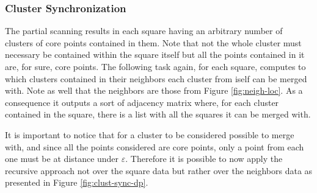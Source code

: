 \documentclass[10pt,journal,compsoc]{IEEEtran}
\begin{document}
\subsubsection{Cluster Synchronization} \label{subsec:cluster_sync}
The partial scanning results in each square having an arbitrary number of clusters of core points contained in them. Note that not the whole cluster must necessary be contained within the square itself but all the points contained in it are, for sure, core points. The following task again, for each square, computes to which clusters contained in their neighbors each cluster from iself can be merged with. Note as well that the neighbors are those from Figure \ref{fig:neigh-loc}. As a consequence it outputs a sort of adjacency matrix where, for each cluster contained in the square, there is a list with all the squares it can be merged with.

It is important to notice that for a cluster to be considered possible to merge with, and since all the points considered are core points, only a point from each one must be at distance under $\varepsilon$. Therefore it is possible to now apply the recursive approach not over the square data but rather over the neighbors data as presented in Figure \ref{fig:clust-sync-dp}.
\end{document}
